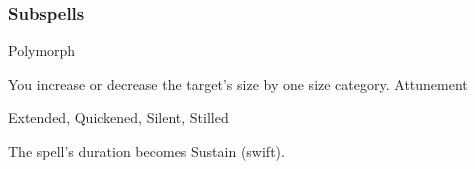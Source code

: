 \subsubsection{Subspells}
\begin{spellsection}{Polymorph}
\begin{spellheader}
\end{spellheader}
\begin{spellcontent}
\begin{spelltargetinginfo}
\end{spelltargetinginfo}
\begin{spelleffects}
\spelleffect
You increase or decrease the target's size by one size category.
\spelldur Attunement
\end{spelleffects}
\end{spellcontent}
\begin{spellfooter}
 Extended, Quickened, Silent, Stilled
\end{spellfooter}
\begin{spellsubcontent}
\begin{spellcantrip}
The spell's duration becomes Sustain (swift).
\end{spellcantrip}
\end{spellsubcontent}
\end{spellsection}
